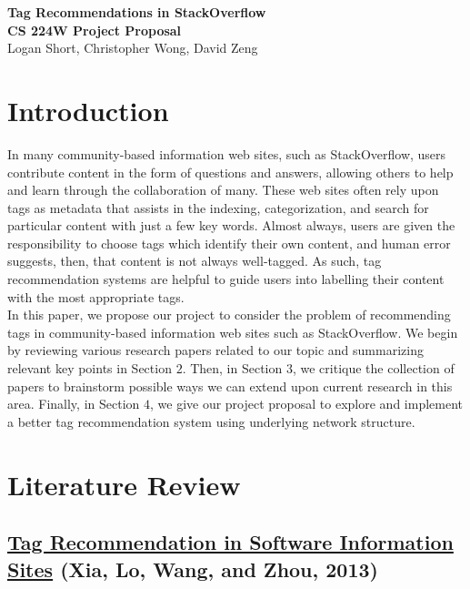 \documentclass[11pt, final]{article}
\newcommand{\br}[1][.75]{\ \\[#1\baselineskip]}
\begin{document}
\begin{center}
\LARGE{\textbf{Tag Recommendations in StackOverflow}}\\
\Large{\textbf{CS 224W Project Proposal}}\\
\Large{Logan Short, Christopher Wong, David Zeng}
\end{center}

\section{Introduction}

In many community-based information web sites, such as StackOverflow, users contribute content in the form of questions and answers, allowing others to help and learn through the collaboration of many. These web sites often rely upon tags as metadata that assists in the indexing, categorization, and search for particular content with just a few key words. Almost always, users are given the responsibility to choose tags which identify their own content, and human error suggests, then, that content is not always well-tagged. As such, tag recommendation systems are helpful to guide users into labelling their content with the most appropriate tags.\br
In this paper, we propose our project to consider the problem of recommending tags in community-based information web sites such as StackOverflow. We begin by reviewing various research papers related to our topic and summarizing relevant key points in Section $2$. Then, in Section $3$, we critique the collection of papers to brainstorm possible ways we can extend upon current research in this area. Finally, in Section $4$, we give our project proposal to explore and implement a better tag recommendation system using underlying network structure.

\section{Literature Review}

\subsection{\href{http://ieeexplore.ieee.org/stamp/stamp.jsp?arnumber=6624040}{Tag Recommendation in Software Information Sites} (Xia, Lo, Wang, and Zhou, 2013)}
\end{document}
